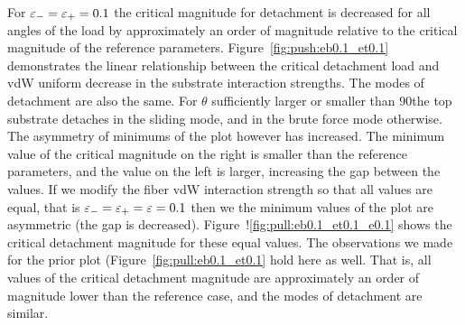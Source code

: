 For $\varepsilon_- = \varepsilon_+ = 0.1$ the critical magnitude for detachment is decreased for all angles of the load by approximately an order of magnitude relative to the critical magnitude of the reference parameters. Figure~\ref{fig:push:eb0.1_et0.1} demonstrates the linear relationship between the critical detachment load and vdW uniform decrease in the substrate interaction strengths. The modes of detachment are also the same. For $\theta$ sufficiently larger or smaller than $90$\textdegree the top substrate detaches in the sliding mode, and in the brute force mode otherwise. The asymmetry of minimums of the plot however has increased. The minimum value of the critical magnitude on the right is smaller than the reference parameters, and the  value on the left is larger, increasing the gap between the values. If we modify the fiber vdW interaction strength so that all values are equal, that is $\varepsilon_- = \varepsilon_+ = \varepsilon = 0.1$ then we the minimum values of the plot are asymmetric (the gap is decreased). Figure~!\ref{fig:pull:eb0.1_et0.1_e0.1} shows the critical detachment magnitude for these equal values. The observations we made for the prior plot (Figure~\ref{fig:pull:eb0.1_et0.1} hold here as well. That is, all values of the critical detachment magnitude are approximately an order of magnitude lower than the reference case, and the modes of detachment are similar.

